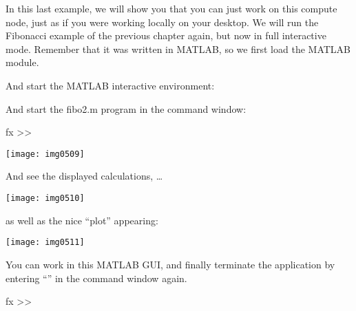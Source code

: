 In this last example, we will show you that you can just work on this compute
node, just as if you were working locally on your desktop.  We will run the
Fibonacci example of the previous chapter again, but now in full interactive
mode. Remember that it was written in MATLAB, so we first load the MATLAB
module.

\begin{prompt}
\end{prompt}

And start the MATLAB interactive environment:

\begin{prompt}
\end{prompt}

And start the fibo2.m program in the command window:
\begin{prompt}
fx >> %
\end{prompt}

\texttt{[image: img0509]}

And see the displayed calculations, \dots

\texttt{[image: img0510]}

as well as the nice ``plot'' appearing:

\texttt{[image: img0511]}

You can work in this MATLAB GUI, and finally terminate the application by
entering ``'' in the command window again.

\begin{prompt}
fx >> %
\end{prompt}
